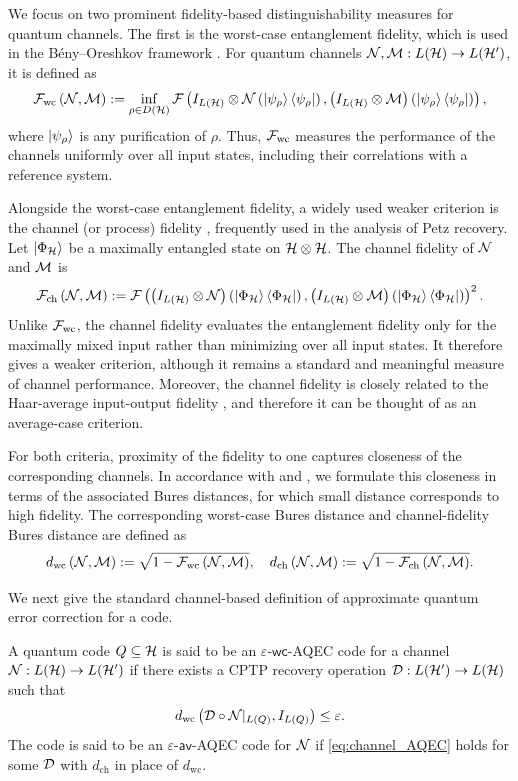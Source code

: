 \documentclass[10pt]{article}
\newcommand{\p}[1]{\left(#1\right)}
\newcommand{\s}[1]{\mathsf{#1}}
\begin{document}
 We focus on two prominent fidelity-based distinguishability measures for quantum channels. The first is the worst-case entanglement fidelity, which is used in the B\'eny--Oreshkov framework \cite{beny2010general}. For quantum channels ${\cal N},{\cal M}:L({\cal H})\to L({\cal H}')$, it is defined as
\[
\calF_{\mathrm{wc}}\p{\calN,\calM}
:=
\inf_{\rho\in D(\calH)}
\calF\p{
I_{L(\calH)}\otimes\calN\p{\ket{\psi_{\rho}}\bra{\psi_{\rho}}},
\p{I_{L(\calH)}\otimes\calM}\p{\ket{\psi_{\rho}}\bra{\psi_{\rho}}}
},
\]
where $\ket{\psi_{\rho}}$ is any purification of $\rho$. Thus, ${\cal F}_{\mathrm{wc}}$ measures the performance of the channels uniformly over all input states, including their correlations with a reference system.

Alongside the worst-case entanglement fidelity, a widely used weaker criterion is the channel (or process) fidelity \cite{audenaert2002optimizing,kosut2009quantum,noh2018quantum,zheng2024near}, frequently used in the analysis of Petz recovery. Let $\ket{\Phi_{{\cal H}}}$ be a maximally entangled state on ${\cal H}\otimes{\cal H}$. The channel fidelity of ${\cal N}$ and ${\cal M}$ is
\[ \calF_{\mathrm{ch}}\p{\calN,\calM} :=\calF\p{\p{I_{L(\calH)}\otimes\calN}\p{\ket{\Phi_{\calH}}\bra{\Phi_{\calH}}}, \p{I_{L(\calH)}\otimes\calM}\p{\ket{\Phi_{\calH}}\bra{\Phi_{\calH}}}}^2. \]
Unlike ${\cal F}_{\mathrm{wc}}$, the channel fidelity evaluates the entanglement fidelity only for the maximally mixed input rather than minimizing over all input states. It therefore gives a weaker criterion, although it remains a standard and meaningful measure of channel performance. Moreover, the channel fidelity is closely related to the Haar-average input-output fidelity \cite[Sec.~6.4]{khatri2020principles}, and therefore it can be thought of as an average-case criterion.

For both criteria, proximity of the fidelity to one captures closeness of the corresponding channels. 
In accordance with \cite{beny2010general} and \cite{Elimelech2026Theory}, we formulate this closeness in terms of the associated Bures distances, for which small distance corresponds to high fidelity. The corresponding worst-case Bures distance and channel-fidelity Bures distance are defined as
\[ d_{\mathrm{wc}}\p{\calN,\calM} :=\sqrt{1-\calF_{\mathrm{wc}}\p{\calN,\calM}}, \quad d_{\mathrm{ch}}\p{\calN,\calM}:=\sqrt{1-\calF_{\mathrm{ch}}\p{\calN,\calM}}. \] 

We next give the standard channel-based definition of approximate quantum error correction for a code. \begin{definition}\label{def:AQECchannel}
    A quantum code $Q\subseteq{\cal H}$ is said to be an $\varepsilon$-$\s{wc}$-AQEC code for a channel ${\cal N}:L({\cal H})\to L({\cal H}')$ if there exists a CPTP recovery operation ${\cal D}:L({\cal H}')\to L({\cal H})$ such that
\begin{equation}
d_{\mathrm{wc}}\p{\calD\circ\calN|_{L(Q)},I_{L(Q)}}\leq\varepsilon.
\label{eq:channel_AQEC}
\end{equation}
The code is said to be an $\varepsilon$-$\s{av}$-AQEC code for ${\cal N}$ if \eqref{eq:channel_AQEC} holds for some ${\cal D}$ with $d_{\mathrm{ch}}$ in place of $d_{\mathrm{wc}}$. 
\end{definition}
\end{document}
